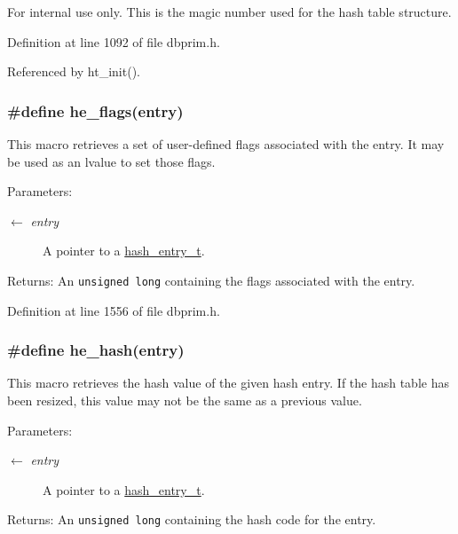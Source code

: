 \begin{Desc}
\item[For internal use only.]
This is the magic number used for the hash table structure.\end{Desc}


Definition at line 1092 of file dbprim.h.

Referenced by ht\_\-init().\hypertarget{group__dbprim__hash_ga41}{
\subsubsection[he\_\-flags]{\setlength{\rightskip}{0pt plus 5cm}\#define he\_\-flags(entry)}}
\label{group__dbprim__hash_ga41}


This macro retrieves a set of user-defined flags associated with the entry. It may be used as an lvalue to set those flags.

\begin{Desc}
\item[Parameters:]
\begin{description}
\item[\mbox{$\leftarrow$} {\em entry}]A pointer to a \hyperlink{group__dbprim__hash_ga2}{hash\_\-entry\_\-t}.\end{description}
\end{Desc}
\begin{Desc}
\item[Returns:]An {\tt unsigned long} containing the flags associated with the entry.\end{Desc}


Definition at line 1556 of file dbprim.h.\hypertarget{group__dbprim__hash_ga43}{
\subsubsection[he\_\-hash]{\setlength{\rightskip}{0pt plus 5cm}\#define he\_\-hash(entry)}}
\label{group__dbprim__hash_ga43}


This macro retrieves the hash value of the given hash entry. If the hash table has been resized, this value may not be the same as a previous value.

\begin{Desc}
\item[Parameters:]
\begin{description}
\item[\mbox{$\leftarrow$} {\em entry}]A pointer to a \hyperlink{group__dbprim__hash_ga2}{hash\_\-entry\_\-t}.\end{description}
\end{Desc}
\begin{Desc}
\item[Returns:]An {\tt unsigned long} containing the hash code for the entry.\end{Desc}


